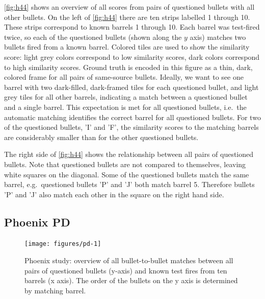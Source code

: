 \documentclass[doubleblind]{elsarticle}\usepackage[]{graphicx}\usepackage[]{color}
\newenvironment{knitrout}{}{} %
\begin{document}
\autoref{fig:h44} shows an overview of all scores from pairs of questioned bullets with all other bullets. On the left of \autoref{fig:h44} there are ten strips labelled 1 through 10. These strips correspond to known barrels 1 through 10. Each barrel was test-fired twice, so each of the questioned bullets (shown along the $y$ axis) matches two bullets fired from a known barrel. Colored tiles are used to show the similarity score: light grey colors correspond to low similarity scores, dark colors correspond to high similarity scores. Ground truth is encoded in this figure as a thin, dark, colored frame for all pairs of same-source bullets. 
Ideally, we want to see one barrel with two dark-filled, dark-framed tiles for each questioned bullet, and light grey tiles for all other barrels, indicating a match between a questioned bullet and a single barrel. This expectation is met for all questioned bullets, i.e.\ the automatic matching  identifies the correct barrel for all questioned bullets. For two of the questioned bullets, 'I' and 'F', the similarity scores to the matching barrels are considerably smaller than for the other questioned bullets. 

The right side of \autoref{fig:h44} shows the relationship between all pairs of questioned bullets. Note that questioned bullets are not compared to themselves, leaving white squares on the diagonal. Some of the questioned bullets match the same barrel, e.g.\ questioned bullets 'P' and 'J' both match barrel 5. Therefore bullets 'P' and 'J' also match each other in the square on the right hand side.



\subsection{Phoenix PD}

\begin{knitrout}
\color{fgcolor}\begin{figure}

{\centering \texttt{[image: figures/pd-1]} 

}

\caption[Phoenix study]{Phoenix study: overview of all bullet-to-bullet matches between all pairs of questioned bullets (y-axis) and known test fires from ten barrels (x axis). The order of the bullets on the y axis is determined by matching barrel.}\label{fig:pd}
\end{figure}


\end{knitrout}
\end{document}
